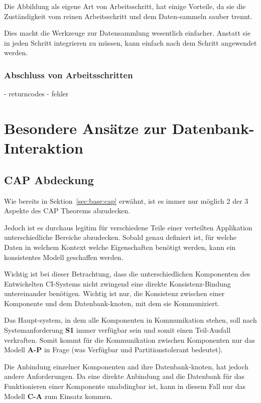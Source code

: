 Die Abbildung als eigene Art von Arbeitsschritt,
hat einige Vorteile, da sie die Zuständigkeit vom reinen Arbeitsschritt
und dem Daten-sammeln sauber trennt.

Dies macht die Werkzeuge zur Datensammlung wesentlich einfacher.
Anstatt sie in jeden Schritt integrieren zu müssen,
kann einfach nach dem Schritt angewendet werden.


\subsubsection{Abschluss von Arbeitsschritten}

- returncodes
- fehler

\section{Besondere Ansätze zur Datenbank-Interaktion}



\subsection{CAP Abdeckung}

Wie bereits in Sektion~\ref{sec:base:cap} erwähnt,
ist es immer nur möglich 2 der 3 Aspekte des CAP Theorems abzudecken.

Jedoch ist es durchaus legitim für verschiedene Teile
einer verteilten Applikation unterschiedliche Bereiche abzudecken.
Sobald genau definiert ist, für welche Daten in welchem Kontext welche Eigenschaften benötigt werden,
kann ein konsistentes Modell geschaffen werden.

Wichtig ist bei dieser Betrachtung, dass die unterschiedlichen Komponenten des Entwickelten CI-Systems
nicht zwingend eine direkte Konsistenz-Bindung untereinander benötigen.
Wichtig ist nur, die Konsistenz zwischen einer Komponente
und dem Datenbank-knoten, mit dem sie Kommuniziert.

Das Haupt-system, in dem alle Komponenten in Kommunikation stehen,
soll nach Systemanforderung \textbf{S1} immer verfügbar sein und somit einen Teil-Ausfall  verkraften.
Somit kommt für die Kommunikation zwischen Komponenten nur das Modell \textbf{A-P} in Frage
(was Verfügbar und Partitionstolerant bedeutet).

Die Anbindung einzelner Komponenten and ihre Datenbank-knoten, hat jedoch andere Anforderungen.
Da eine direkte Anbindung and die Datenbank für das Funktionieren einer Komponente unabdingbar ist,
kann in diesem Fall nur das Modell \textbf{C-A} zum Einsatz kommen.


